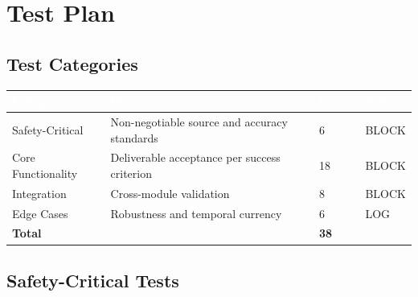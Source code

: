\documentclass[11pt,letterpaper]{article}
\newcommand{\tableheader}[1]{\textbf{\sffamily\textcolor{white}{#1}}}
\begin{document}
\section{Test Plan}

\subsection{Test Categories}

\begin{center}
\begin{tabularx}{\textwidth}{L{3cm}XC{2cm}C{2cm}}
\toprule
{}
\tableheader{Category} & \tableheader{Purpose} & \tableheader{Count} & \tableheader{Failure} \\
\midrule
Safety-Critical & Non-negotiable source and accuracy standards & 6 & BLOCK \\
Core Functionality & Deliverable acceptance per success criterion & 18 & BLOCK \\
Integration & Cross-module validation & 8 & BLOCK \\
Edge Cases & Robustness and temporal currency & 6 & LOG \\
\midrule
\textbf{Total} & & \textbf{38} & \\
\bottomrule
\end{tabularx}
\end{center}

\subsection{Safety-Critical Tests}
\end{document}
